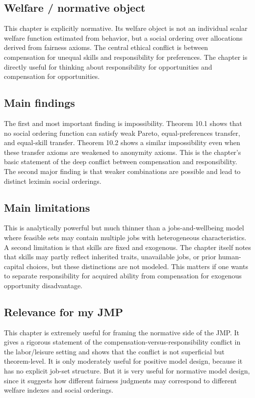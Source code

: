 \documentclass[11pt,a4paper]{article}
\begin{document}
\subsection*{Welfare / normative object}
This chapter is explicitly normative. Its welfare object is not an individual scalar welfare function estimated from behavior, but a social ordering over allocations derived from fairness axioms. The central ethical conflict is between compensation for unequal skills and responsibility for preferences. The chapter is directly useful for thinking about responsibility for opportunities and compensation for opportunities.

\subsection*{Main findings}
The first and most important finding is impossibility. Theorem 10.1 shows that no social ordering function can satisfy weak Pareto, equal-preferences transfer, and equal-skill transfer. Theorem 10.2 shows a similar impossibility even when these transfer axioms are weakened to anonymity axioms. This is the chapter’s basic statement of the deep conflict between compensation and responsibility. The second major finding is that weaker combinations are possible and lead to distinct leximin social orderings.

\subsection*{Main limitations}
This is analytically powerful but much thinner than a jobs-and-wellbeing model where feasible sets may contain multiple jobs with heterogeneous characteristics. A second limitation is that skills are fixed and exogenous. The chapter itself notes that skills may partly reflect inherited traits, unavailable jobs, or prior human-capital choices, but these distinctions are not modeled. This matters if one wants to separate responsibility for acquired ability from compensation for exogenous opportunity disadvantage.

\subsection*{Relevance for my JMP}
This chapter is extremely useful for framing the normative side of the JMP. It gives a rigorous statement of the compensation-versus-responsibility conflict in the labor/leisure setting and shows that the conflict is not superficial but theorem-level. It is only moderately useful for positive model design, because it has no explicit job-set structure. But it is very useful for normative model design, since it suggests how different fairness judgments may correspond to different welfare indexes and social orderings.
\end{document}
